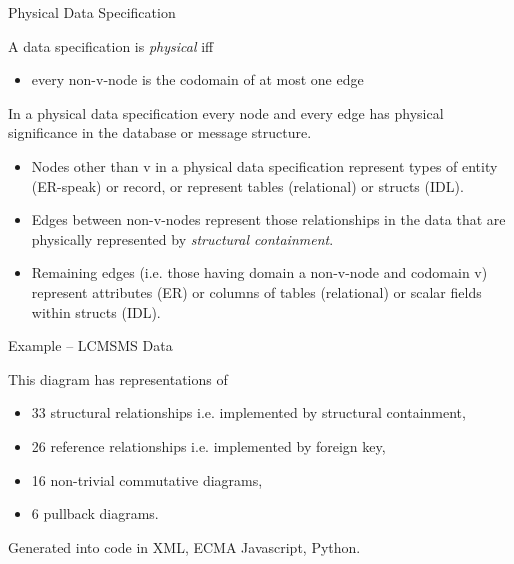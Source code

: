 


\begin{frame}{Physical Data Specification}
\begin{definition}
A data specification is \textit{physical} iff
\begin{itemize}
\item every non-v-node is the codomain of at most one edge
\end{itemize}
\end{definition}
In a physical data specification every node and every edge has physical significance
in the database or message structure.
\begin{itemize}
\item Nodes other than v in a physical data specification represent types of entity (ER-speak) 
or record, or represent tables (relational) or structs (IDL).  
\item Edges between non-v-nodes represent those relationships in the data that are physically represented  by \textit{structural containment}.
\item Remaining edges (i.e. those having domain a  non-v-node and codomain v) represent
attributes (ER) or columns of tables (relational) or scalar fields within structs (IDL).  
\end{itemize}
\end{frame}



\begin{frame}{Example -- LCMSMS Data}
\scalebox{0.2}{

}
\pause
\vspace{-5cm}
\begin{block}{}
This diagram has representations of
\begin{itemize}
  \item 33 structural relationships i.e. implemented by structural containment, 
  \item 26 reference relationships i.e. implemented by foreign key,
  \item 16 non-trivial commutative diagrams,
  \item 6 pullback diagrams.
\end{itemize}
Generated into code in XML, ECMA Javascript, Python.
\end{block}
\end{frame}


